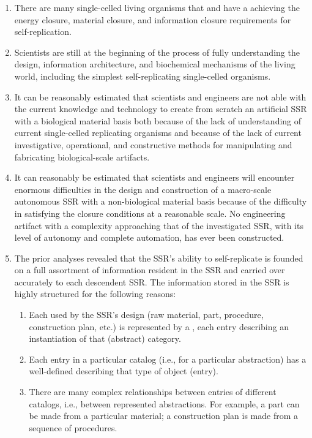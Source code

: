 \begin{enumerate}
\item There are many single-celled living organisms that
 and have a  achieving the energy closure, material
closure, and information closure requirements for self-replication.
\item Scientists are still at the beginning of the process of
fully understanding the design, information architecture,
and biochemical mechanisms of the living world, including
the simplest self-replicating single-celled organisms.  
\item It can be reasonably estimated that scientists and
engineers are not able with the current knowledge and technology to
create from scratch an artificial SSR with a biological
material basis both because of the lack of understanding of current single-celled
replicating organisms and because of the lack of current investigative,
operational, and constructive methods for manipulating and fabricating 
biological-scale artifacts.
\item It can reasonably be estimated that scientists and
engineers will encounter enormous difficulties in the
design and construction of a macro-scale autonomous SSR with a
non-biological material basis because of the difficulty
in satisfying the closure conditions at a reasonable scale.  No engineering
artifact with a \mbox{complexity} approaching that of the investigated SSR, with
its level of autonomy and complete automation, has ever been constructed.
\item The prior analyses revealed that the SSR's
ability to self-replicate is founded on a full assortment of
 information resident in the SSR and carried over
accurately to each descendent SSR.  The information stored in the SSR
is highly structured for the following reasons:

\begin{enumerate}
\item Each  used by the SSR's design (raw
material, part, procedure, construction plan, etc.) is represented by a
, each entry describing an instantiation of
that (abstract) category.
\item Each entry in a particular catalog (i.e., for a particular
abstraction) has a well-defined  describing
that type of object (entry).
\item There are many complex relationships between entries of
different catalogs, i.e., between represented abstractions. For example,
a part can be made from a particular material; a construction plan is
made from a sequence of procedures.
\end{enumerate}
\end{enumerate}

